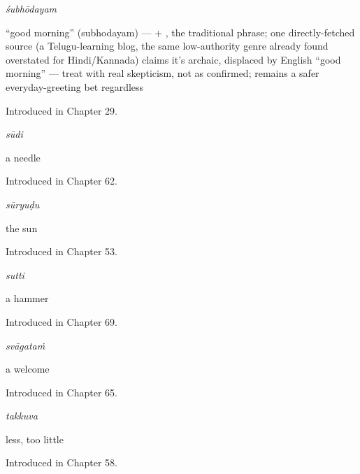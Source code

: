 \noindent\begin{minipage}[t]{\linewidth}
\raggedright
\textbf{}\enspace\emph{śubhōdayam}\par
\small \textquotedblleft{}good morning\textquotedblright{} (subhodayam) —  + , the traditional phrase; one directly-fetched source (a Telugu-learning blog, the same low-authority genre already found overstated for Hindi/Kannada) claims it's archaic, displaced by English \textquotedblleft{}good morning\textquotedblright{} — treat with real skepticism, not as confirmed;  remains a safer everyday-greeting bet regardless\par
\footnotesize Introduced in Chapter 29.
\end{minipage}\par\medskip

\noindent\begin{minipage}[t]{\linewidth}
\raggedright
\textbf{}\enspace\emph{sūdi}\par
\small a needle\par
\footnotesize Introduced in Chapter 62.
\end{minipage}\par\medskip

\noindent\begin{minipage}[t]{\linewidth}
\raggedright
\textbf{}\enspace\emph{sūryuḍu}\par
\small the sun\par
\footnotesize Introduced in Chapter 53.
\end{minipage}\par\medskip

\noindent\begin{minipage}[t]{\linewidth}
\raggedright
\textbf{}\enspace\emph{sutti}\par
\small a hammer\par
\footnotesize Introduced in Chapter 69.
\end{minipage}\par\medskip

\noindent\begin{minipage}[t]{\linewidth}
\raggedright
\textbf{}\enspace\emph{svāgataṁ}\par
\small a welcome\par
\footnotesize Introduced in Chapter 65.
\end{minipage}\par\medskip

\noindent\begin{minipage}[t]{\linewidth}
\raggedright
\textbf{}\enspace\emph{takkuva}\par
\small less, too little\par
\footnotesize Introduced in Chapter 58.
\end{minipage}\par\medskip

